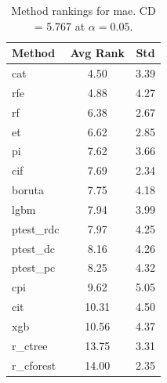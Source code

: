 \begin{table}[h]
\centering
\caption{Method rankings for mae. CD = 5.767 at $\alpha=0.05$.}
\label{tab:ranks_mae}
\begin{tabular}{lcc}
\toprule
Method & Avg Rank & Std \\
\midrule
cat & 4.50 & 3.39 \\
rfe & 4.88 & 4.27 \\
rf & 6.38 & 2.67 \\
et & 6.62 & 2.85 \\
pi & 7.62 & 3.66 \\
cif & 7.69 & 2.34 \\
boruta & 7.75 & 4.18 \\
lgbm & 7.94 & 3.99 \\
ptest_rdc & 7.97 & 4.25 \\
ptest_dc & 8.16 & 4.26 \\
ptest_pc & 8.25 & 4.32 \\
cpi & 9.62 & 5.05 \\
cit & 10.31 & 4.50 \\
xgb & 10.56 & 4.37 \\
r_ctree & 13.75 & 3.31 \\
r_cforest & 14.00 & 2.35 \\
\bottomrule
\end{tabular}
\end{table}